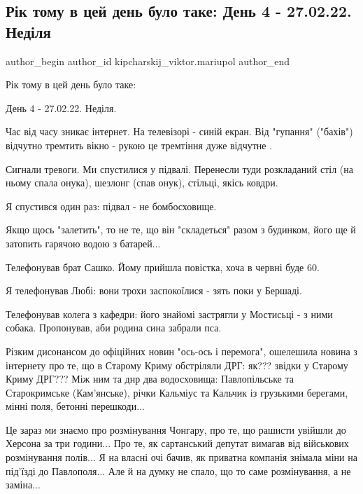  
 
 
 
 

\subsection{Рік тому в цей день було таке:  День 4 - 27.02.22.  Неділя}
\label{sec:27_02_2023.fb.kipcharskij_viktor.mariupol.1.r_k_tomu_v_tsei_den_}

\ifcmt
 author_begin
   author_id kipcharskij_viktor.mariupol
 author_end
\fi

Рік тому в цей день було таке: 

День 4 - 27.02.22.  Неділя. 

Час від часу зникає інтернет. На телевізорі - синій екран. Від "гупання"
("бахів") відчутно тремтить вікно - рукою це тремтіння дуже відчутне .

Сигнали тревоги. Ми спустилися у підвалі. Перенесли туди розкладаний стіл (на
ньому спала онука), шезлонг (спав онук), стільці, якісь ковдри.

Я спустився один раз: підвал - не бомбосховище.

Якщо щось "залетить", то не те, що він "складеться" разом з будинком, його ще й
затопить гарячою водою з батарей...

Телефонував брат Сашко. Йому прийшла повістка, хоча в червні буде 60.

Я телефонував Любі: вони трохи заспокоїлися - зять поки у Бершаді.

Телефонував колега з кафедри: його знайомі застрягли у Мостисьці - з ними
собака. Пропонував, аби родина сина забрали пса.

Різким дисонансом до офіційних новин "ось-ось і перемога", ошелешила новина з
інтернету про те, що в Старому Криму обстріляли ДРГ: як??? звідки у Старому
Криму ДРГ??? Між ним та днр два водосховища: Павлопільське та Старокримське
(Кам'янське), річки Кальміус та Кальчик із грузькими берегами, мінні поля,
бетонні перешкоди...

Це зараз ми знаємо про розмінування Чонгару, про те, що рашисти увійшли до
Херсона за три години... Про те, як сартанський депутат вимагав від військових
розмінування полів... Я на власні очі бачив, як приватна компанія знімала міни
на під'їзді до Павлополя... Але й на думку не спало, що то саме розмінування, а
не заміна...


